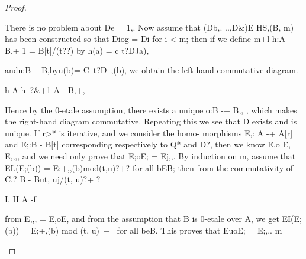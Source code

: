 \begin{proof}
\begin{mathematicalrecord}
There is no problem about De = 1,. Now assume that (Db,. ..,D&)E
HS,(B, m) has been constructed so that Diog = Di for i < m; then if we define
                                                                           m+l
         h:A   -B,+            1   = B[t]/(t??)               by h(a) = c        t?DJa),

andu:B--+B,byu(b)=                    C~t?D~,(b),             we obtain the left-hand commutative
diagram.




                                                          h
          A h--?&+1                               A   -          B,+,


Hence by the 0-etale assumption, there exists a unique o:B -+ B,, , which
makes the right-hand diagram commutative. Repeating this we see that
D exists and is unique. If r>* is iterative, and we consider the homo-
morphisms    E,: A -+ A[r] and E;:B - B[t] corresponding      respectively
to Q* and D?, then we know E,o E, = E,,,, and we need only prove that
E;oE; = Ej,,. By induction on m, assume that
         EL(E;(b)) = E:+,,(b)mod(t,u)?+?                          for all bEB;
then from the commutativity                  of
                            C.?
          B           -                           But, uj/(t, u)?+ ?

          I,                                        II
          A -f%

from E,,, = E,oE, and from the assumption                                that B is 0-etale over A, we get
         EI(E;(b)) = E;+,(b) mod (t, u)~+~                              for all beB.
This proves that EuoE; = E;,,.    m
\end{mathematicalrecord}
\end{proof}


